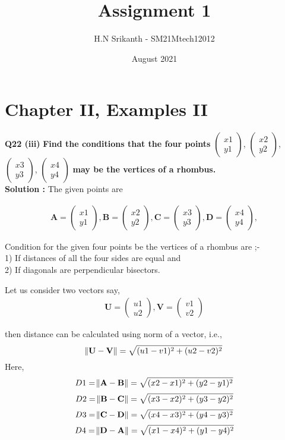 \documentclass{article}
\title{\textbf{\Huge Assignment 1}}
\author{\large H.N Srikanth - SM21Mtech12012}
\date{August 2021}
\begin{document}
\providecommand{\mbf}{\mathbf}


\newcommand{\myvec}[1]{\ensuremath{\begin{pmatrix}#1\end{pmatrix}}}
\let\vec\mathbf


\maketitle

\section*{Chapter II, Examples II}
\textbf{Q22 (iii)}
\textbf{Find the conditions that the four points}
\myvec{x1\\y1}, \myvec{x2\\y2},
\myvec{x3\\y3}, \myvec{x4\\y4}
\textbf{ may be the vertices of a rhombus.}\\

\textbf{Solution :}
\vspace{0.2cm}
 The given points are


\begin{align*}
\vec{A} = \myvec{x1\\y1}, \vec{B} =\myvec{x2\\y2},
\vec{C} =\myvec{x3\\y3}, \vec{D} =\myvec{x4\\y4},
\end{align*}


Condition for the given four points be the vertices of a rhombus are ;-\\
1) If distances of all the four sides are equal and\\
2) If diagonals are perpendicular bisectors.

\vspace{0.2cm}

Let us consider two vectors say,
\begin{align*}
\vec{U} = \myvec{u1\\u2}, \vec{V} =\myvec{v1\\v2}
\end{align*} 


then distance can be calculated using norm of a vector, i.e., 
$$\norm{ \vec{U} - \vec{V}} = \sqrt{(u1-v1)^2+(u2-v2)^2}$$
Here, $$ D1=\norm{ \vec{A} - \vec{B}} =\sqrt{(x2-x1)^2+(y2-y1)^2}$$
$$ D2=\norm{ \vec{B} - \vec{C}} =\sqrt{(x3-x2)^2+(y3-y2)^2}$$
$$ D3=\norm{ \vec{C} - \vec{D}} =\sqrt{(x4-x3)^2+(y4-y3)^2}$$
$$ D4=\norm{ \vec{D} - \vec{A}} =\sqrt{(x1-x4)^2+(y1-y4)^2}$$
\end{document}
